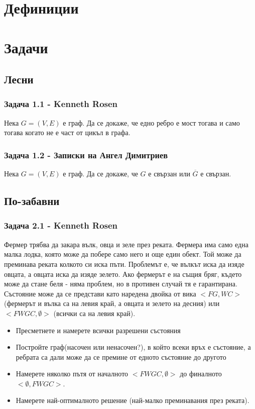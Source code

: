 \documentclass[12pt]{article}
\begin{document}
\section*{Дефиниции}

\section*{Задачи}

\subsection*{Лесни}
\subsubsection*{Задача 1.1 - Kenneth Rosen}
Нека $G = (V, E)$ е граф. Да се докаже, че едно ребро е мост тогава и само тогава когато не е част от цикъл в графа. 
\subsubsection*{Задача 1.2 - Записки на Ангел Димитриев}
Нека $G = (V, E)$ е граф. Да се докаже, че $G$ е свързан или $\overline{G}$ е свързан. 

\subsection*{По-забавни}
\subsubsection*{Задача 2.1 - Kenneth Rosen}
Фермер трябва да закара вълк, овца и зеле през реката. Фермера има само една малка лодка, която може да побере само него и още един обект. Той може да преминава реката колкото си иска пъти. Проблемът е, че вълкът иска да изяде овцата, а овцата иска да изяде зелето. Ако фермерът е на същия бряг, където може да стане беля - няма проблем, но в противен случай тя е гарантирана. Състояние може да се представи като наредена двойка от вика $<FG, WC>$(фермерът и вълка са на левия край, а овцата и зелето на десния) или $<FWGC, \emptyset>$ (всички са на левия край).

\begin{itemize}
    \item Пресметнете и намерете всички разрешени състояния
    \item Постройте граф(насочен или ненасочен?), в който всеки връх е състояние, а ребрата са дали може да се премине от едното състояние до другото
    \item Намерете няколко пътя от началното $<FWGC, \emptyset>$ до финалното $<\emptyset, FWGC>$.
    \item Намерете най-оптималното решение (най-малко преминавания през реката).
\end{itemize}
\end{document}
